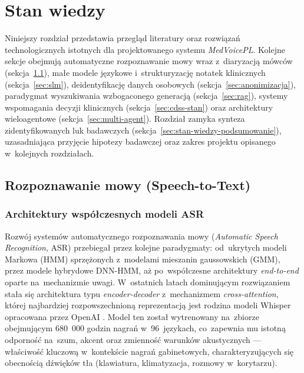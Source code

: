 \chapter{Stan wiedzy}\label{ch:stan-wiedzy}


Niniejszy rozdział przedstawia przegląd literatury oraz rozwiązań
technologicznych istotnych dla projektowanego systemu \emph{MedVoicePL}.
Kolejne sekcje obejmują automatyczne rozpoznawanie mowy wraz
z~diaryzacją mówców (sekcja~\ref{sec:stt}), małe modele językowe
i~strukturyzację notatek klinicznych (sekcja~\ref{sec:slm}),
deidentyfikację danych osobowych (sekcja~\ref{sec:anonimizacja}),
paradygmat wyszukiwania wzbogaconego generacją (sekcja~\ref{sec:rag}),
systemy wspomagania decyzji klinicznych (sekcja~\ref{sec:cdss-stan})
oraz architektury wieloagentowe (sekcja~\ref{sec:multi-agent}).
Rozdział zamyka synteza zidentyfikowanych luk badawczych
(sekcja~\ref{sec:stan-wiedzy-podsumowanie}), uzasadniająca przyjęcie
hipotezy badawczej oraz zakres projektu opisanego w~kolejnych
rozdziałach.

\section{Rozpoznawanie mowy (Speech-to-Text)}\label{sec:stt}

\subsection{Architektury współczesnych modeli ASR}

Rozwój systemów automatycznego rozpoznawania mowy (\emph{Automatic
Speech Recognition}, ASR) przebiegał przez kolejne paradygmaty:
od~ukrytych modeli Markowa (HMM) sprzężonych z~modelami mieszanin
gaussowskich (GMM), przez modele hybrydowe DNN-HMM, aż po~współczesne
architektury \emph{end-to-end} oparte na~mechanizmie uwagi.
W~ostatnich latach dominującym rozwiązaniem stała się architektura
typu \emph{encoder-decoder} z~mechanizmem \emph{cross-attention},
której najbardziej rozpowszechnioną reprezentacją jest rodzina modeli
Whisper opracowana przez OpenAI \parencite{radford2023whisper}. Model
ten został wytrenowany na~zbiorze obejmującym 680~000 godzin nagrań
w~96~językach, co~zapewnia mu istotną odporność na~szum, akcent oraz
zmienność warunków akustycznych --- właściwość kluczową w~kontekście
nagrań gabinetowych, charakteryzujących się obecnością dźwięków tła
(klawiatura, klimatyzacja, rozmowy w~korytarzu).

